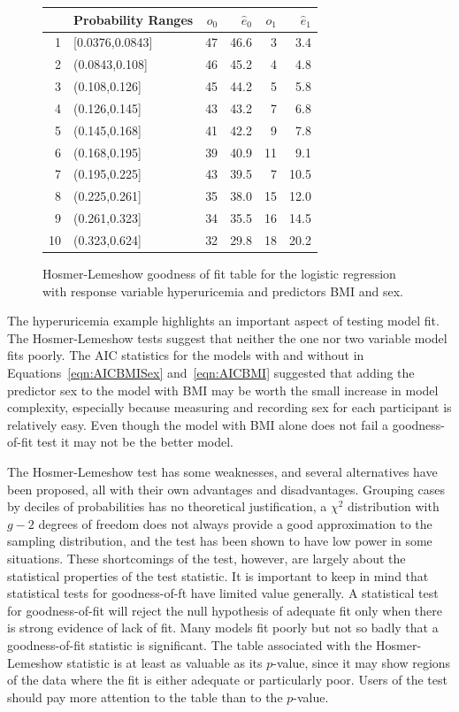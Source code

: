\begin{figure}[ht]
\centering
\begin{tabular}{rlrrrr}
  \hline
 & Probability Ranges & $o_0$ & $\hat{e}_0$ & $o_1$ & $\hat{e}_1$ \\
  \hline
1 & [0.0376,0.0843] & 47 & 46.6 & 3 & 3.4 \\
  2 & (0.0843,0.108] & 46 & 45.2 & 4 & 4.8 \\
  3 & (0.108,0.126] & 45 & 44.2 & 5 & 5.8 \\
  4 & (0.126,0.145] & 43 & 43.2 & 7 & 6.8 \\
  5 & (0.145,0.168] & 41 & 42.2 & 9 & 7.8 \\
  6 & (0.168,0.195] & 39 & 40.9 & 11 & 9.1 \\
  7 & (0.195,0.225] & 43 & 39.5 & 7 & 10.5 \\
  8 & (0.225,0.261] & 35 & 38.0 & 15 & 12.0 \\
  9 & (0.261,0.323] & 34 & 35.5 & 16 & 14.5 \\
  10 & (0.323,0.624] & 32 & 29.8 & 18 & 20.2 \\
   \hline
\end{tabular}
\caption{Hosmer-Lemeshow goodness of fit table for the
       logistic regression with response variable hyperuricemia and predictors BMI and sex.}
\label{figure:HLTestHyperuricemiaBMISex}
\end{figure}

The hyperuricemia example highlights an important aspect of testing model fit.  The Hosmer-Lemeshow tests suggest that neither the one nor two variable model fits poorly. The AIC statistics for the models with and without  in Equations~\ref{eqn:AICBMISex} and~\ref{eqn:AICBMI} suggested that adding the predictor sex to the model with BMI  may be worth the small increase in model complexity, especially because measuring and recording sex for each participant is relatively easy. Even though the model with BMI alone does not fail a goodness-of-fit test it may not be the better model. 

The Hosmer-Lemeshow test has some weaknesses, and several alternatives have been proposed, all with their own advantages and disadvantages.  Grouping cases by deciles of probabilities has no theoretical justification, a $\chi^2$  distribution with $g - 2$ degrees of freedom does not always provide a good approximation to the sampling distribution, and the test has been shown to have low power in some situations.  These shortcomings of the test, however, are largely about the statistical properties of the test statistic.  It is important to keep in mind that statistical tests for goodness-of-ft have limited value generally.  A statistical test for goodness-of-fit will reject the null hypothesis of adequate fit only when there is strong evidence of lack of fit.  Many models fit poorly but not so badly that a goodness-of-fit statistic is significant.  The table associated with the Hosmer-Lemeshow statistic is at least as valuable as its $p$-value, since it may show regions of the data where the fit is either adequate or particularly poor. Users of the test should pay more attention to the table than to the $p$-value.

